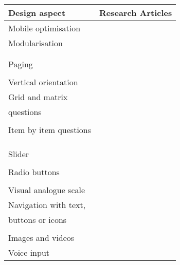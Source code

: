 \begin{table}
	\centering
	\begin{tabular}{ll}
		\toprule
		Design aspect  &  Research Articles \\
		\midrule
		Mobile optimisation & \cite{arn_evaluation_2015, revilla_open_2016}\\
		Modularisation & \cite{antoun_design_2018, callegaro_mixed-mode_2013}\\
    	& \cite{toepoel_modularization_2018, bansal_shorter_2017}\\
    	& \cite{mason_effect_2019}\\
    	Paging & \cite{de_bruijne_improving_2014}\\
    	& \cite{mavletova_mobile_2014}\\
        Vertical orientation & \cite{de_bruijne_improving_2014}\\
        Grid and matrix & \cite{revilla_experiment_2017, mavletova_grid_2018}\\
    	questions & \cite{revilla_comparing_2018, revilla_testing_2018}\\
    	& \cite{tourangeau_web_2017}\\
        Item by item questions & \cite{revilla_experiment_2017, revilla_comparing_2018}\\
    	& \cite{mavletova_grid_2018}\\
    	& \cite{revilla_testing_2018}\\
    	& \cite{tourangeau_web_2017, grady_what_2019}\\
        Slider & \cite{antoun_effects_2017, maineri_slider_2021}\\
    	& \cite{toepoel_sliders_2018}\\
        Radio buttons & \cite{olmsted-hawala_optimal_2018}\\
    	& \cite{ cernat_radio_2019}\\
        Visual analogue scale & \cite{toepoel_sliders_2018}\\
        Navigation with text, & \cite{revilla_comparing_2018}\\
    	buttons or icons & \cite{ olmsted-hawala_optimal_2018}\\
         & \cite{lugtig_recruiting_2019, revilla_testing_2018}\\
        Images and videos & \cite{mendelson_displaying_2017, trubner_effects_2020}\\
    	Voice input & \cite{revilla_improving_2021, revilla_testing_2020}\\

\end{tabular}
\end{table}
